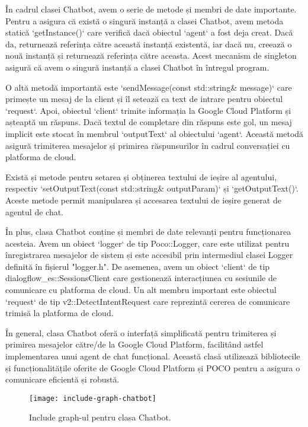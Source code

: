 În cadrul clasei Chatbot, avem o serie de metode și membri de date importante. Pentru a asigura că există o singură instanță a clasei Chatbot, avem metoda statică `getInstance()` care verifică dacă obiectul `agent` a fost deja creat. Dacă da, returnează referința către această instanță existentă, iar dacă nu, creează o nouă instanță și returnează referința către aceasta. Acest mecanism de singleton asigură că avem o singură instanță a clasei Chatbot în întregul program.

O altă metodă importantă este `sendMessage(const std::string\& message)` care primește un mesaj de la client și îl setează ca text de intrare pentru obiectul `request`. Apoi, obiectul `client` trimite informația la Google Cloud Platform și așteaptă un răspuns. Dacă textul de completare din răspuns este gol, un mesaj implicit este stocat în membrul `outputText` al obiectului `agent`. Această metodă asigură trimiterea mesajelor și primirea răspunsurilor în cadrul conversației cu platforma de cloud.

Există și metode pentru setarea și obținerea textului de ieșire al agentului, respectiv `setOutputText(const std::string\& outputParam)` și `getOutputText()`. Aceste metode permit manipularea și accesarea textului de ieșire generat de agentul de chat.

În plus, clasa Chatbot conține și membri de date relevanți pentru funcționarea acesteia. Avem un obiect `logger` de tip Poco::Logger, care este utilizat pentru înregistrarea mesajelor de sistem și este accesibil prin intermediul clasei Logger definită în fișierul "logger.h". De asemenea, avem un obiect `client` de tip dialogflow\_es::SessionsClient care gestionează interacțiunea cu sesiunile de comunicare cu platforma de cloud. Un alt membru important este obiectul `request` de tip v2::DetectIntentRequest care reprezintă cererea de comunicare trimisă la platforma de cloud.

În general, clasa Chatbot oferă o interfață simplificată pentru trimiterea și primirea mesajelor către/de la Google Cloud Platform, facilitând astfel implementarea unui agent de chat funcțional. Această clasă utilizează bibliotecile și funcționalitățile oferite de Google Cloud Platform și POCO pentru a asigura o comunicare eficientă și robustă.

\begin{figure}[h]
  \centering
  \texttt{[image: include-graph-chatbot]}
  \caption{Include graph-ul pentru clasa Chatbot.}
  \label{fig:includeGraphChatbot}
\end{figure}

